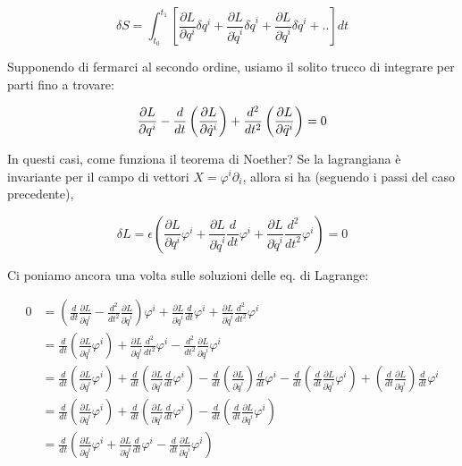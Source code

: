 \documentclass{report}
\begin{document}
\begin{equation}
    \delta S = \int_{t_0}^{t_1} \left[ \frac{\partial L}{\partial q^i}\delta q^i + \frac{\partial L}{\partial \dot{q}^i}\delta \dot{q}^i +  \frac{\partial L}{\partial \ddot{q}^i}\delta \ddot{q}^i + ..\right]dt
\end{equation}

Supponendo di fermarci al secondo ordine, usiamo il solito trucco di integrare per parti fino a trovare: 

\begin{equation}
    \frac{\partial L}{\partial q^i} - \frac{d}{dt}\left(\frac{\partial L}{\partial \dot{q}^i}\right) + \frac{d^2}{dt^2}\left(\frac{\partial L}{\partial \ddot{q}^i}\right)=0
    \\[20pt]
\end{equation}

In questi casi, come funziona il teorema di Noether? Se la lagrangiana è invariante per il campo di vettori $X = \varphi^i \partial_i$, allora si ha (seguendo i passi del caso precedente), 

\begin{equation}
    \delta L = \epsilon \left(\frac{\partial L }{\partial q^i}\varphi^i + \frac{\partial L }{\partial \dot{q}^i}\frac{d}{dt}\varphi^i + \frac{\partial L }{\partial \ddot{q}^i}\frac{d^2}{dt^2}\varphi^i \right) = 0 
\end{equation}

Ci poniamo ancora una volta sulle soluzioni delle eq. di Lagrange:

\begin{align}
    0 &= \left(\frac{d}{dt}\frac{\partial L }{\partial \dot{q}^i} -  \frac{d^2}{dt^2}\frac{\partial L }{\partial \ddot{q}^i}\right)\varphi^i + \frac{\partial L }{\partial \dot{q}^i}\frac{d}{dt}\varphi^i + \frac{\partial L }{\partial \ddot{q}^i}\frac{d^2}{dt^2}\varphi^i \\
    &= \frac{d}{dt}\left(\frac{\partial L }{\partial \dot{q}^i}\varphi^i \right) + \frac{\partial L }{\partial \ddot{q}^i}\frac{d^2}{dt^2}\varphi^i -  \frac{d^2}{dt^2}\frac{\partial L }{\partial \ddot{q}^i}\varphi^i \\
    &= \frac{d}{dt}\left(\frac{\partial L }{\partial \dot{q}^i}\varphi^i \right) + \frac{d}{dt}\left(\frac{\partial L }{\partial \ddot{q}^i}\frac{d}{dt}\varphi^i \right) - \frac{d}{dt}\left(\frac{\partial L }{\partial \ddot{q}^i}\right) \frac{d}{dt}\varphi^i  - \frac{d}{dt}\left(\frac{d}{dt}\frac{\partial L }{\partial \ddot{q}^i}\varphi^i \right) +\left(\frac{d}{dt}\frac{\partial L }{\partial \ddot{q}^i} \right) \frac{d}{dt} \varphi^i \\
    &= \frac{d}{dt}\left(\frac{\partial L }{\partial \dot{q}^i}\varphi^i \right) + \frac{d}{dt}\left(\frac{\partial L }{\partial \ddot{q}^i}\frac{d}{dt}\varphi^i \right)   - \frac{d}{dt}\left(\frac{d}{dt}\frac{\partial L }{\partial \ddot{q}^i}\varphi^i \right) \\
    &= \frac{d}{dt}\left(\frac{\partial L }{\partial \dot{q}^i}\varphi^i +  \frac{\partial L }{\partial \ddot{q}^i}\frac{d}{dt}\varphi^i - \frac{d}{dt}\frac{\partial L }{\partial \ddot{q}^i}\varphi^i\right)
\end{align}
\end{document}
